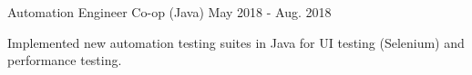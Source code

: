 \begin{cventries}
  \cventry
    {Automation Engineer Co-op (Java)} %
    {} %
    {} %
    {May 2018 - Aug. 2018} %
    {
      \begin{cvitems} %
\item Implemented new automation testing suites in Java for UI testing (Selenium) and performance testing.
      \end{cvitems}
    }

\end{cventries}
